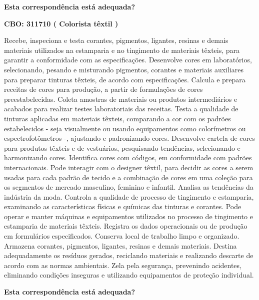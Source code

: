\documentclass[
]{article}
\begin{document}
\begin{Form}
\textbf{Esta correspondência está adequada?} \\ 
\end{Form}

\textbf{CBO: 311710  ( Colorista têxtil )}

Recebe, inspeciona e testa corantes, pigmentos, ligantes, resinas e
demais materiais utilizados na estamparia e no tingimento de materiais
têxteis, para garantir a conformidade com as especificações. Desenvolve
cores em laboratórios, selecionando, pesando e misturando pigmentos,
corantes e materiais auxiliares para preparar tinturas têxteis, de
acordo com especificações. Calcula e prepara receitas de cores para
produção, a partir de formulações de cores preestabelecidas. Coleta
amostras de materiais ou produtos intermediários e acabados para
realizar testes laboratoriais das receitas. Testa a qualidade de
tinturas aplicadas em materiais têxteis, comparando a cor com os padrões
estabelecidos - seja visualmente ou usando equipamentos como
colorímetros ou espectrofotômetros -, ajustando e padronizando cores.
Desenvolve cartela de cores para produtos têxteis e de vestuários,
pesquisando tendências, selecionando e harmonizando cores. Identifica
cores com códigos, em conformidade com padrões internacionais. Pode
interagir com o designer têxtil, para decidir as cores a serem usadas
para cada padrão de tecido e a combinação de cores em uma coleção para
os segmentos de mercado masculino, feminino e infantil. Analisa as
tendências da indústria da moda. Controla a qualidade de processo de
tingimento e estamparia, examinando as características físicas e
químicas das tinturas e corantes. Pode operar e manter máquinas e
equipamentos utilizados no processo de tingimento e estamparia de
materiais têxteis. Registra os dados operacionais ou de produção em
formulários especificados. Conserva local de trabalho limpo e
organizado. Armazena corantes, pigmentos, ligantes, resinas e demais
materiais. Destina adequadamente os resíduos gerados, reciclando
materiais e realizando descarte de acordo com as normas ambientais. Zela
pela segurança, prevenindo acidentes, eliminando condições inseguras e
utilizando equipamentos de proteção individual.

\begin{Form}
\textbf{Esta correspondência está adequada?} \\ 
\end{Form}
\end{document}
